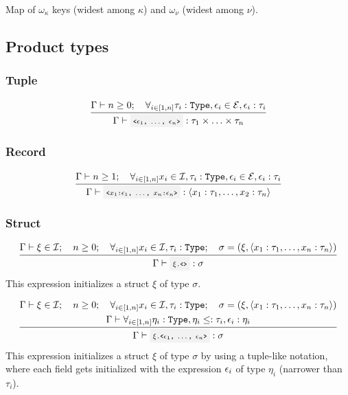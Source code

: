 Map of $\omega_\kappa$ keys (widest  among $\kappa$) and $\omega_\nu$ (widest
among $\nu$).

\clearpage

\subsection{Product types}

\subsubsection{Tuple}

\[
	\infrule{
		\EnvSym\then n \geq 0 \semiq \forall_{i\in[1,n]}{\tau_i:\Type, \expr_i\in\Expr, \expr_i:\tau_i}
	}{
		\EnvSym\then \code{<$\expr_1$, $\dotsc$, $\expr_n$>}:\tau_1 \times \dotsc \times \tau_n
	}
\]

\subsubsection{Record}

\[
	\infrule{
		\EnvSym\then n \geq 1 \semiq \forall_{i\in[1,n]}{x_i\in\Id, \tau_i:\Type, \expr_i\in\Expr, \expr_i:\tau_i}
	}{
		\EnvSym\then \code{<$x_1$:$\expr_1$, $\dotsc$, $x_n$:$\expr_n$>}:\tuple{x_1:\tau_1,\dotsc,x_2:\tau_n}
	}
\]

\subsubsection{Struct}

\[
	\infrule{
		\EnvSym\then \xi \in \Id \semiq n \geq 0 \semiq \forall_{i\in[1,n]}{x_i \in \Id, \tau_i:\Type} \semiq \sigma = (\xi, \tuple{x_1:\tau_1,\dotsc,x_n:\tau_n}) \\*
	}{
		\EnvSym\then \code{$\xi$.<>} : \sigma \\*
	}
\]
This expression initializes a struct $\xi$ of type $\sigma$.

\[
	\infrule{
		\EnvSym\then \xi \in \Id \semiq n \geq 0 \semiq \forall_{i\in[1,n]}{x_i \in \Id, \tau_i:\Type} \semiq \sigma = (\xi, \tuple{x_1:\tau_1,\dotsc,x_n:\tau_n}) \\*
		\EnvSym\then \forall_{i\in[1,n]}{\eta_i:\Type,\eta_i\narreq\tau_i,\expr_i:\eta_i} \\*
	}{
		\EnvSym\then \code{$\xi$.<$\expr_1$, $\dotsc$, $\expr_n$>} : \sigma \\*
	}
\]
This expression initializes a struct $\xi$ of type $\sigma$ by using a
tuple-like notation, where each field gets initialized with the expression
$\epsilon_i$ of type $\eta_i$ (narrower than $\tau_i$).

